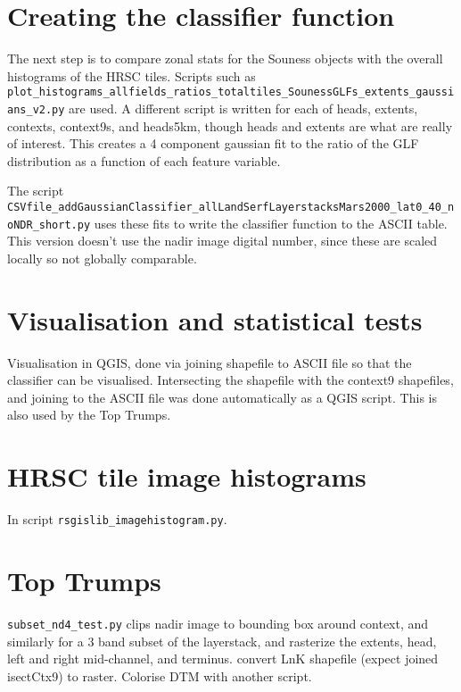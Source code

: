 \documentclass[a4paper,12pt]{article}
\begin{document}
\section{Creating the classifier function}
The next step is to compare zonal stats for the Souness objects with the overall histograms of the HRSC tiles. Scripts such as {\tt plot\_histograms\_allfields\_ratios\_totaltiles\_SounessGLFs\_extents\_gaussians\_v2.py} are used. A different script is written for each of heads, extents, contexts, context9s, and heads5km, though heads and extents are what are really of interest. This creates a 4 component gaussian fit to the ratio of the GLF distribution as a function of each feature variable.

The script {\tt CSVfile\_addGaussianClassifier\_allLandSerfLayerstacksMars2000\_lat0\_40\_noNDR\_short.py} uses these fits to write the classifier function to the ASCII table. This version doesn't use the nadir image digital number, since these are scaled locally so not globally comparable.

\section{Visualisation and statistical tests}
Visualisation in QGIS, done via joining shapefile to ASCII file so that the classifier can be visualised. Intersecting the shapefile with the context9 shapefiles, and joining to the ASCII file was done automatically as a QGIS script. This is also used by the Top Trumps.
\section{HRSC tile image histograms}
In script {\tt rsgislib\_imagehistogram.py}.
\section{Top Trumps}
{\tt subset\_nd4\_test.py} clips nadir image to bounding box around context, and similarly for a 3 band subset of the layerstack, and rasterize the extents, head, left and right mid-channel, and terminus. convert LnK shapefile (expect joined isectCtx9) to raster.
Colorise DTM with another script.
\end{document}
